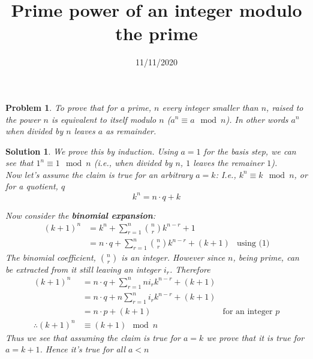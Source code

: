 \documentclass{article}
\title{Prime power of an integer modulo the prime}
\date{11/11/2020}
\newtheorem*{problem*}{Problem}
\newtheorem*{solution*}{Solution}
\begin{document}
\maketitle
 
\begin{problem*}
    To prove that for a prime, $n$ every 
    integer smaller than $n$,
    raised to the power $n$ is equivalent to itself
    modulo $n$ ($a^n \equiv a\mod{n}$).
    In other words $a^n$ when divided by $n$
    leaves $a$ as remainder.
\end{problem*}

\begin{solution*}
    We prove this by induction. Using $a=1$ for the 
    basis step, we can see that $1^n \equiv 1\mod{n}$
    (i.e., when divided by $n$, $1$ leaves the remainer $1$).\\

    Now let's assume the claim is true for an arbitrary
    $a=k$: I.e., $k^n \equiv k\mod{n}$, or for a quotient,
    $q$
    \begin{equation}
        k^n = n\cdot{q} + k
    \end{equation}

    Now consider the \textbf{binomial expansion}:
    \begin{align*}
        (k+1)^n
        &= k^n + \sum_{r=1}^{n}{n\choose{r}}k^{n-r} + 1\\
        &= n\cdot{q} + \sum_{r=1}^{n}{n\choose{r}}k^{n-r} + (k+1)
        &\text{using (1)}
    \end{align*}
    The binomial coefficient, $n\choose{r}$ is an integer.
    However since $n$, being prime, can be extracted from 
    it still leaving an integer $i_r$. Therefore
    \begin{align*}
        (k+1)^n
        &= n\cdot{q} + \sum_{r=1}^{n}n{i_r}k^{n-r} + (k+1)\\
        &= n\cdot{q} + n \sum_{r=1}^{n}{i_r}k^{n-r} + (k+1)\\
        &= n\cdot{p} + (k+1)
        & \text{for an integer $p$}\\
        \therefore (k+1)^n &\equiv (k+1)\mod{n}
    \end{align*}
    Thus we see that assuming the claim is 
    true for $a=k$ we prove that it is true
    for $a=k+1$. Hence it's true for all $a<n$
\end{solution*}
\end{document}
